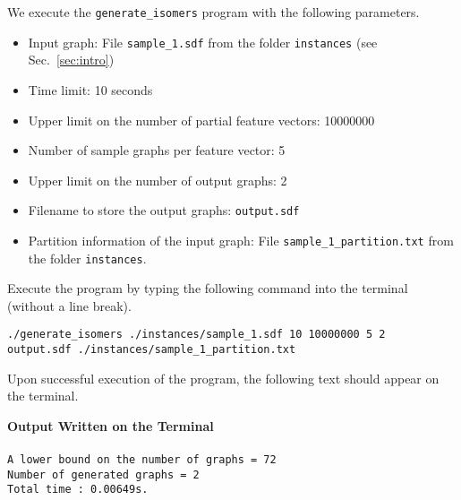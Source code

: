 \documentclass[11pt,titlepage,dvipdfmx,twoside]{article}
\begin{document}
We execute the {\tt generate\_isomers} program with the following parameters.

\begin{itemize}
\item Input graph: File {\tt sample\_1.sdf} from the folder {\tt instances} (see Sec.~\ref{sec:intro})
\item Time limit: 10 seconds
\item Upper limit on the number of partial feature vectors: 10000000
\item Number of sample graphs per feature vector: 5
\item Upper limit on the number of output graphs: 2
\item Filename to store the output graphs: {\tt output.sdf}
\item Partition information of the input graph: File {\tt sample\_1\_partition.txt} from the folder {\tt instances}.
\end{itemize}

Execute the program by typing the following command into the terminal (without a line break).

\bigskip


{\tt ./generate\_isomers ./instances/sample\_1.sdf 10 10000000 5 2} \\
 {\tt output.sdf ./instances/sample\_1\_partition.txt}	


\bigskip

Upon successful execution of the program, the following text should appear on the terminal.

\begin{oframed}
{\bf Output Written on the Terminal}\\\\
{\tt A lower bound on the number of graphs = 72\\
Number of generated graphs = 2\\
Total time : 0.00649s.}
\end{oframed}
\end{document}
